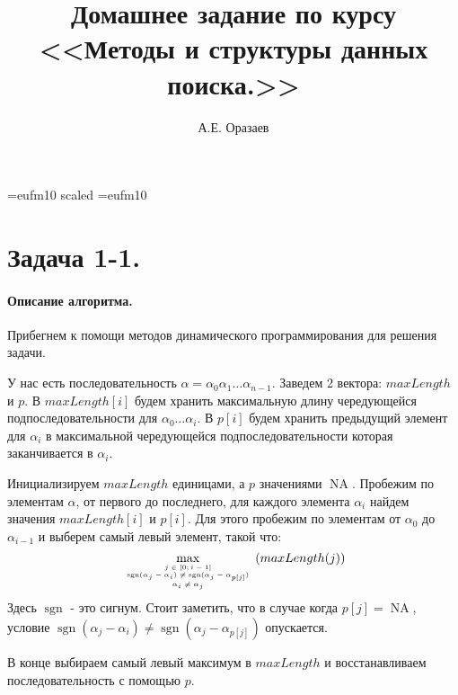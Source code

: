 \documentclass[12pt]{article}
\title{\bf Домашнее задание по курсу \\ <<Методы
и структуры данных поиска.>>}
\author{А.Е. Оразаев}
\date{}
\newcommand{\sgn}{\operatorname{sgn}}
\newcommand{\NA}{\operatorname{NA}}
\begin{document}
\voffset=-20mm 
\hoffset=-12mm
\font\Got=eufm10 scaled \font\Got=eufm10

\maketitle

\section{Задача 1-1.}
\paragraph{Описание алгоритма.}
Прибегнем к помощи методов динамического программирования для решения задачи.

У нас есть последовательность $ \alpha = \alpha_0\alpha_1\dots\alpha_{n-1} $. 
Заведем 2 вектора: $ maxLength $ и $ p $. В $ maxLength[i] $ будем хранить
максимальную длину чередующейся подпоследовательности для $ \alpha_0\dots\alpha_i $.
В $ p[i] $ будем хранить предыдущий элемент для $ \alpha_i $ в максимальной
чередующейся подпоследовательности которая заканчивается в $ \alpha_i $.

Инициализируем $ maxLength $ единицами, а $ p $ значениями $ \NA $.
Пробежим по элементам $ \alpha $, от первого до последнего, для каждого элемента
$ \alpha_i $ найдем значения $ maxLength[i] $ и $ p[i] $. Для этого 
пробежим по элементам от $ \alpha_0 $ до $ \alpha_{i - 1} $ и выберем самый левый
элемент, такой что:
$$ 
    \max\limits_{\tiny\begin{array}{c} j \in [0; i - 1] \\ \sgn(\alpha_j - \alpha_i) \ne \sgn(\alpha_j - \alpha_{p[j]}) \\ \alpha_i \ne \alpha_j \end{array} } (maxLength(j))
$$
Здесь $ \sgn $ - это сигнум. Стоит заметить, что в случае когда $ p[j] = \NA $, условие $ \sgn(\alpha_j - \alpha_i) \ne \sgn(\alpha_j - \alpha_{p[j]}) $ опускается.

В конце выбираем самый левый максимум в $ maxLength $ и восстанавливаем последовательность с помощью $ p $.
\end{document}
